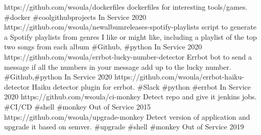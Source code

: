 
\begin{cvhonors}

  \cvhonor
    {https://github.com/wsoula/dockerfiles} %
    {dockerfiles for interesting tools/games. \#docker \#coolgithubprojects}
    {In Service} %
    {2020} %
  \cvhonor
    {https://github.com/wsoula/newalbumreleases-spotify-playlists} %
    {script to generate a Spotify playlists from genres I like or might like, including a playlist of the top two songs from each album \#Github, \#python}
    {In Service} %
    {2020} %
  \cvhonor
    {https://github.com/wsoula/errbot-lucky-number-detector} %
    {Errbot bot to send a message if all the numbers in your message add up to the lucky number. \#Github,\#python}
    {In Service} %
    {2020} %
  \cvhonor
    {https://github.com/wsoula/errbot-haiku-detector} %
    {Haiku detector plugin for errbot.  \#Slack \#python \#errbot}
    {In Service} %
    {2020} %
  \cvhonor
    {https://github.com/wsoula/ci-monkey} %
    {Detect repo and give it jenkins jobs.  \#CI/CD \#shell \#monkey}
    {Out of Service} %
    {2015} %
  \cvhonor
    {https://github.com/wsoula/upgrade-monkey} %
    {Detect version of application and upgrade it based on semver.  \#upgrade \#shell \#monkey}
    {Out of Service} %
    {2019} %
\end{cvhonors}
